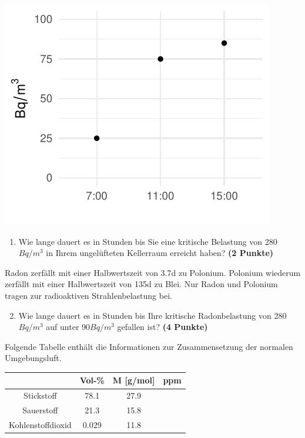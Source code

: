 \documentclass[a4paper, 9pt]{scrartcl}\usepackage[]{graphicx}\usepackage[]{xcolor}
\makeatletter
\def\maxwidth{ %
  \ifdim\Gin@nat@width>\linewidth
    \linewidth
  \else
    \Gin@nat@width
  \fi
}
\newenvironment{knitrout}{}{} %
\makeatother
\begin{document}
\begin{knitrout}
\color{fgcolor}

{\centering \includegraphics[width=\maxwidth]{img/math-10-1} 

}


\end{knitrout}

\vspace{-0.75cm}

\begin{enumerate}
\item Wie lange dauert es in Stunden bis Sie eine kritische Belastung von
  280$Bq/m^3$ in Ihrem ungelüfteten Kellerraum erreicht haben?
  \textbf{(2 Punkte)}
\end{enumerate}

Radon zerfällt mit einer Halbwertszeit von 3.7d zu
Polonium. Polonium wiederum zerfällt mit einer Halbwertszeit von
135d zu Blei. Nur Radon und Polonium tragen zur
radioaktiven Strahlenbelastung bei.

\begin{enumerate}
  \setcounter{enumi}{1}
\item Wie lange dauert es in Stunden bis Ihre kritische Radonbelastung von
  280$Bq/m^3$ auf unter 90$Bq/m^3$ gefallen ist?
  \textbf{(4 Punkte)}
\end{enumerate}

Folgende Tabelle enthält die Informationen zur Zusammensetzung der
normalen Umgebungsluft.

\begin{center}
  \begin{tabular}{ c|c|c|c }
     & Vol-\% & M [g/mol] & ppm \\
    \hline
    Stickstoff & 78.1 & 27.9 &
                                                    \phantom{1000000000000}\strut\\
        \hline
    Sauerstoff & 21.3 & 15.8 &
                                                    \phantom{10000000}\strut\\
        \hline
    Kohlenstoffdioxid & 0.029 & 11.8 & \phantom{10000000}\strut\\     
     \hline
\end{tabular}
\end{center}
\end{document}
